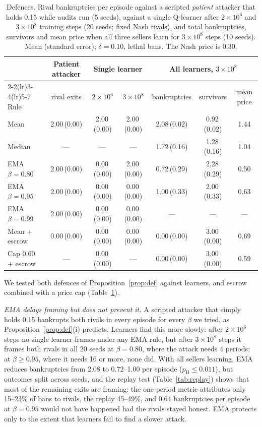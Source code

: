 \documentclass{article}
\newcommand{\se}[1]{\,{\scriptsize(#1)}}
\begin{document}
\begin{table}[t]
\centering
\caption{Defences. Rival bankruptcies per episode against a scripted \emph{patient} attacker that holds 0.15 while audits run (5 seeds), against a single Q-learner after $2\times10^6$ and $3\times10^8$ training steps (20 seeds; fixed Nash rivals), and total bankruptcies, survivors and mean price when all three sellers learn for $3\times10^8$ steps (10 seeds). Mean (standard error); $\delta=0.10$, lethal bans. The Nash price is 0.30.}
\label{tab:defences}
\small
\begin{tabular}{@{}lcccccc@{}}
\toprule
& Patient attacker & \multicolumn{2}{c}{Single learner} & \multicolumn{3}{c}{All learners, $3\times10^8$} \\
\cmidrule(lr){2-2}\cmidrule(lr){3-4}\cmidrule(lr){5-7}
Rule & rival exits & $2\times10^6$ & $3\times10^8$ & bankruptcies & survivors & mean price \\
\midrule
Mean            & 2.00\se{0.00} & 2.00\se{0.00} & 2.00\se{0.00} & 2.08\se{0.02} & 0.92\se{0.02} & 1.44 \\
Median          & ---           & ---           & ---           & 1.72\se{0.16} & 1.28\se{0.16} & 1.04 \\
EMA $\beta{=}0.80$ & 2.00\se{0.00} & 0.00\se{0.00} & 2.00\se{0.00} & 0.72\se{0.29} & 2.28\se{0.29} & 0.50 \\
EMA $\beta{=}0.95$ & 2.00\se{0.00} & 0.00\se{0.00} & 0.00\se{0.00} & 1.00\se{0.33} & 2.00\se{0.33} & 0.63 \\
EMA $\beta{=}0.99$ & 2.00\se{0.00} & 0.00\se{0.00} & 0.00\se{0.00} & ---           & ---           & ---  \\
Mean + escrow   & 0.00\se{0.00} & 0.00\se{0.00} & 0.00\se{0.00} & 0.00\se{0.00} & 3.00\se{0.00} & 0.69 \\
Cap 0.60 + escrow & ---         & 0.00\se{0.00} & ---           & 0.00\se{0.00} & 3.00\se{0.00} & 0.59 \\
\bottomrule
\end{tabular}
\end{table}

We tested both defences of Proposition~\ref{prop:def} against learners, and escrow combined with a price cap (Table~\ref{tab:defences}).

\emph{EMA delays framing but does not prevent it.} A scripted attacker that simply holds 0.15 bankrupts both rivals in every episode for every $\beta$ we tried, as Proposition~\ref{prop:def}(i) predicts. Learners find this more slowly: after $2\times10^6$ steps no single learner frames under any EMA rule, but after $3\times10^8$ steps it frames both rivals in all 20 seeds at $\beta=0.80$, where the attack needs 4 periods; at $\beta\ge0.95$, where it needs 16 or more, none did. With all sellers learning, EMA reduces bankruptcies from 2.08 to 0.72--1.00 per episode ($p_{\mathrm{H}}\le0.011$), but outcomes split across seeds, and the replay test (Table~\ref{tab:replay}) shows that most of the remaining exits are framing: the one-period metric attributes only 15--23\% of bans to rivals, the replay 45--49\%, and $0.64$ bankruptcies per episode at $\beta=0.95$ would not have happened had the rivals stayed honest. EMA protects only to the extent that learners fail to find a slower attack.
\end{document}
